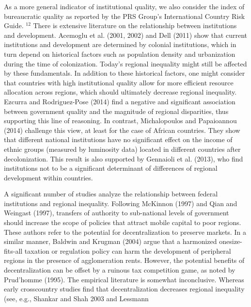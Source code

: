 \documentclass[10pt]{article}
\begin{document}
As a more general indicator of institutional quality, we also consider the index of bureaucratic quality as reported by the PRS Group's International Country Risk Guide. ${ }^{12}$ There is extensive literature on the relationship between institutions and development. Acemoglu et al. (2001, 2002) and Dell (2011) show that current institutions and development are determined by colonial institutions, which in turn depend on historical factors such as population density and urbanization during the time of colonization. Today's regional inequality might still be affected by these fundamentals. In addition to these historical factors, one might consider that countries with high institutional quality allow for more efficient resource allocation across regions, which should ultimately decrease regional inequality. Ezcurra and Rodriguez-Pose (2014) find a negative and significant association between government quality and the magnitude of regional disparities, thus supporting this line of reasoning. In contrast, Michalopoulos and Papaioannou (2014) challenge this view, at least for the case of African countries. They show that different national institutions have no significant effect on the income of ethnic groups (measured by luminosity data) located in different countries after decolonization. This result is also supported by Gennaioli et al. (2013), who find institutions not to be a significant determinant of differences of regional development within countries.

A significant number of studies analyze the relationship between federal institutions and regional inequality. Following McKinnon (1997) and Qian and Weingast (1997), transfers of authority to sub-national levels of government should increase the scope of policies that attract mobile capital to poor regions. These authors refer to the potential for decentralization to preserve markets. In a similar manner, Baldwin and Krugman (2004) argue that a harmonized onesize-fits-all taxation or regulation policy can harm the development of peripheral regions in the presence of agglomeration rents. However, the potential benefits of decentralization can be offset by a ruinous tax competition game, as noted by Prud'homme (1995). The empirical literature is somewhat inconclusive. Whereas early crosscountry studies find that decentralization decreases regional inequality (see, e.g., Shankar and Shah 2003 and Lessmann
\end{document}
